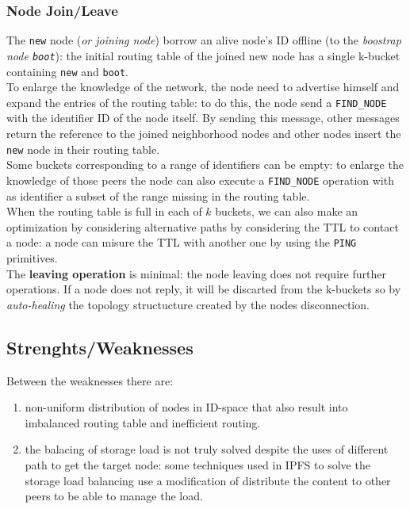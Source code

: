 \documentclass[10pt,a4paper]{report}
\begin{document}
\subsubsection{Node Join/Leave}\label{sec:node-joinleave}
The \texttt{new} node (\textit{or joining node}) borrow an alive node's ID offline (to the \textit{boostrap node \texttt{boot}}): the initial routing table of the joined new node has a single k-bucket containing \texttt{new} and \texttt{boot}.\\
To enlarge the knowledge of the network, the node need to advertise himself and expand the entries of the routing table: to do this, the node send a \texttt{FIND\_NODE} with the identifier ID of the node itself. By sending this message, other messages return the reference to the joined neighborhood nodes and other nodes insert the \texttt{new} node in their routing table.\\
Some buckets corresponding to a range of identifiers can be empty: to enlarge the knowledge of those peers the node can also execute a \texttt{FIND\_NODE} operation with as identifier a subset of the range missing in the routing table.\\
When the routing table is full in each of $k$ buckets, we can also make an optimization by considering alternative paths by considering the TTL to contact a node: a node can misure the TTL with another one by using the \texttt{PING} primitives.\\

The \textbf{leaving operation} is minimal: the node leaving does not require further operations. If a node does not reply, it will be discarted from the k-buckets so by \textit{auto-healing} the topology structucture created by the nodes disconnection.
\subsection{Strenghts/Weaknesses}\label{sec:strenghtsweaknesses}
Between the weaknesses there are:
\begin{enumerate}
	\item 
	non-uniform distribution of nodes in ID-space that also result into imbalanced routing table and inefficient routing.
	\item 
	the balacing of storage load is not truly solved despite the uses of different path to get the target node: some techniques used in IPFS to solve the storage load balancing use a modification of distribute the content to other peers to be able to manage the load.
\end{enumerate}
\end{document}
